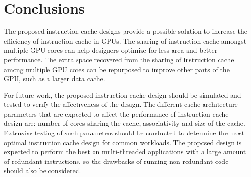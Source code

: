 \section{Conclusions}

The proposed instruction cache designs provide a possible solution to 
increase the efficiency of instruction cache in GPUs. 
The sharing of instruction cache amongst multiple GPU cores can help 
designers optimize for less area and better performance. 
The extra space recovered from the sharing of instruction cache among 
multiple GPU cores can be repurposed to improve other parts of the 
GPU, such as a larger data cache.

For future work, the proposed instruction cache design should be 
simulated and tested to verify the affectiveness of the design. 
The different cache architecture parameters that are expected to 
affect the performance of instruction cache design are: number of 
cores sharing the cache, associativity and size of the cache. 
Extensive testing of such parameters should be conducted to determine 
the most optimal instruction cache design for common workloads. 
The proposed design is expected to perform the best on multi-threaded 
applications with a large amount of redundant instructions, so the 
drawbacks of running non-redundant code should also be considered.
